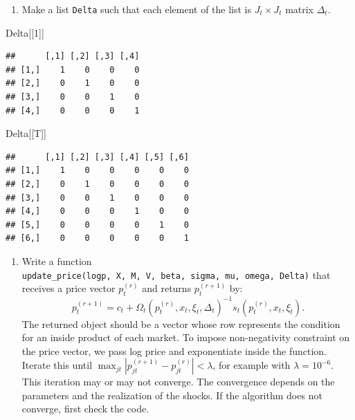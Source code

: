 \documentclass[]{book}
\newenvironment{Shaded}{\begin{snugshade}}{\end{snugshade}}
\newcommand{\DecValTok}[1]{\textcolor[rgb]{0.00,0.00,0.81}{#1}}
\newcommand{\NormalTok}[1]{#1}
\providecommand{\tightlist}{%
  \setlength{\itemsep}{0pt}\setlength{\parskip}{0pt}}
\begin{document}
\begin{enumerate}
\def\labelenumi{\arabic{enumi}.}
\setcounter{enumi}{5}
\tightlist
\item
  Make a list \texttt{Delta} such that each element of the list is
  \(J_t \times J_t\) matrix \(\Delta_t\).
\end{enumerate}

\begin{Shaded}
\begin{Highlighting}[]
\NormalTok{Delta[[}\DecValTok{1}\NormalTok{]]}
\end{Highlighting}
\end{Shaded}

\begin{verbatim}
##      [,1] [,2] [,3] [,4]
## [1,]    1    0    0    0
## [2,]    0    1    0    0
## [3,]    0    0    1    0
## [4,]    0    0    0    1
\end{verbatim}

\begin{Shaded}
\begin{Highlighting}[]
\NormalTok{Delta[[T]]}
\end{Highlighting}
\end{Shaded}

\begin{verbatim}
##      [,1] [,2] [,3] [,4] [,5] [,6]
## [1,]    1    0    0    0    0    0
## [2,]    0    1    0    0    0    0
## [3,]    0    0    1    0    0    0
## [4,]    0    0    0    1    0    0
## [5,]    0    0    0    0    1    0
## [6,]    0    0    0    0    0    1
\end{verbatim}

\begin{enumerate}
\def\labelenumi{\arabic{enumi}.}
\setcounter{enumi}{6}
\tightlist
\item
  Write a function
  \texttt{update\_price(logp,\ X,\ M,\ V,\ beta,\ sigma,\ mu,\ omega,\ Delta)}
  that receives a price vector \(p_t^{(r)}\) and returns
  \(p_t^{(r + 1)}\) by: \[
  p_t^{(r + 1)} = c_t + \Omega_t(p_t^{(r)}, x_t, \xi_t, \Delta_t)^{-1} s_t(p_t^{(r)}, x_t, \xi_t).
  \] The returned object should be a vector whose row represents the
  condition for an inside product of each market. To impose
  non-negativity constraint on the price vector, we pass log price and
  exponentiate inside the function. Iterate this until
  \(\max_{jt}|p_{jt}^{(r + 1)} - p_{jt}^{(r)}| < \lambda\), for example
  with \(\lambda = 10^{-6}\). This iteration may or may not converge.
  The convergence depends on the parameters and the realization of the
  shocks. If the algorithm does not converge, first check the code.
\end{enumerate}
\end{document}
